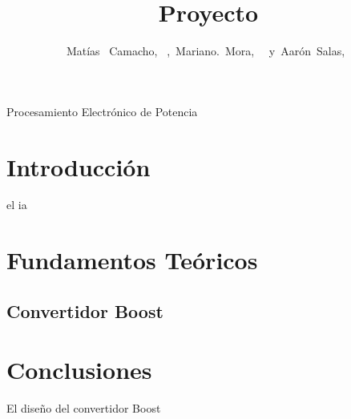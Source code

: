 \documentclass[journal]{IEEEtran}
\begin{document}
%
\title{Proyecto}


\author{Matías ~Camacho,~
        ,~Mariano.~Mora,~
        ~y~Aarón~Salas,~
}


%
{Procesamiento Electrónico de Potencia}


\maketitle


\section{Introducción}

 el ia


\section{Fundamentos Teóricos}

\subsection{Convertidor Boost}



\section{Conclusiones}
El diseño del convertidor Boost 


\printbibliography
\end{document}
